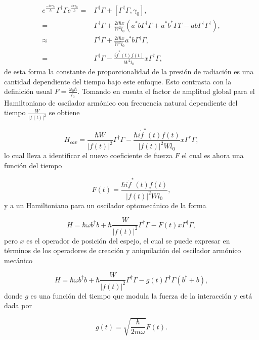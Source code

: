 \documentclass[10pt,a4paper]{report}
\begin{document}
\begin{align*}
e^{\frac{-ix\gamma_0}{\hbar}}\Gamma^\dagger \Gamma e^{\frac{ix\gamma_0}{\hbar}} =& \Gamma^\dagger \Gamma + [\Gamma^\dagger \Gamma, \gamma_0], \\
=& \Gamma^\dagger \Gamma + \frac{2i\hbar x}{W^2 l_0}(a^*b \Gamma^\dagger \Gamma + a^*b^* \Gamma \Gamma -ab\Gamma^\dagger \Gamma^\dagger),\\
\approx & \Gamma^\dagger \Gamma + \frac{2i\hbar x}{W^2 l_0} a^*b \Gamma^\dagger \Gamma, \\
=& \Gamma^\dagger \Gamma - \frac{i \dot{f}^*(t)f(t) }{W^2 l_0} x  \Gamma^\dagger \Gamma,
\end{align*} de esta forma la constante de proporcionalidad de la presión de radiación es una cantidad dependiente del tiempo bajo este enfoque. Esto contrasta con la definición usual $F= \frac{\omega_0 \hbar}{l_0}$. Tomando en cuenta el factor de amplitud global para el Hamiltoniano de oscilador armónico con frecuencia natural dependiente del tiempo $\frac{W}{|f(t)|^2}$ se obtiene

\begin{equation}
H_{cav} = \frac{\hbar W}{|f(t)|^2}\Gamma^\dagger \Gamma - \frac{\hbar i\dot{f}^*(t)f(t) }{|f(t)|^2W l_0}x  \Gamma^ \dagger \Gamma,
\end{equation} lo cual lleva a identificar el nuevo coeficiente de fuerza $F$ el cual es ahora una función del tiempo

\begin{equation}
F(t) = \frac{\hbar i\dot{f}^*(t)f(t) }{|f(t)|^2W l_0},
\end{equation} y a un Hamiltoniano para un oscilador optomecánico de la forma

\begin{equation}
H = \hbar \omega b^\dagger b + \hbar\frac{ W}{|f(t)|^2}\Gamma^\dagger \Gamma -F(t)x\Gamma^\dagger \Gamma,
\end{equation} pero $x$ es el operador de posición del espejo, el cual se puede expresar en términos de los operadores de creación y aniquilación del oscilador armónico mecánico

\begin{equation}
H = \hbar \omega b^\dagger b + \hbar\frac{ W}{|f(t)|^2}\Gamma^\dagger \Gamma -g(t)\Gamma^\dagger \Gamma(b^\dagger + b),
\end{equation} donde $g$ es una función del tiempo que modula la fuerza de la interacción y está dada por

\begin{equation}
g(t) = \sqrt{\frac{\hbar}{2m\omega}}F(t).
\end{equation}
\end{document}
